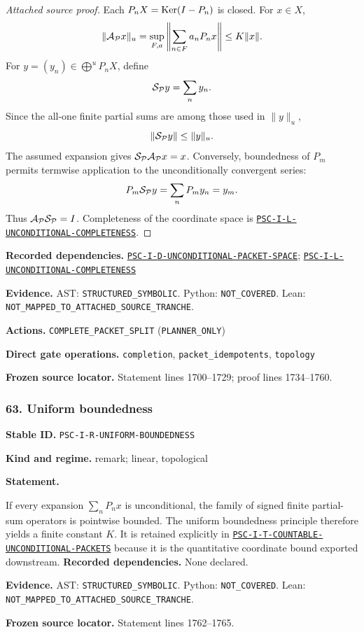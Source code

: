 \documentclass[a4paper,11pt]{article}
\newcommand{\field}[2]{\noindent\textbf{#1.} #2\par}
\begin{document}
\begin{proof}[Attached source proof]
Each $P_nX=\operatorname{Ker}(I-P_n)$ is closed.  For $x\in X$,
\[
\|\mathcal A_{\mathcal P}x\|_u
=
\sup_{F,a}
\left\|\sum_{n\in F}a_nP_nx\right\|
\leq K\|x\|.
\]
For $y=(y_n)\in\bigoplus^uP_nX$, define
\[
\mathcal S_{\mathcal P}y=\sum_ny_n.
\]
Since the all-one finite partial sums are among those used in $\|y\|_u$,
\[
\|\mathcal S_{\mathcal P}y\|
\leq\|y\|_u.
\]
The assumed expansion gives $\mathcal S_{\mathcal P}\mathcal A_{\mathcal P}x=x$.  Conversely, boundedness of $P_m$ permits termwise application to the unconditionally convergent series:
\[
P_m\mathcal S_{\mathcal P}y
=
\sum_nP_my_n
=y_m.
\]
Thus $\mathcal A_{\mathcal P}\mathcal S_{\mathcal P}=I$.  Completeness of the coordinate space is \hyperref[rec:PSC-I-L-UNCONDITIONAL-COMPLETENESS]{\nolinkurl{PSC-I-L-UNCONDITIONAL-COMPLETENESS}}.
\end{proof}
\field{Recorded dependencies}{\hyperref[rec:PSC-I-D-UNCONDITIONAL-PACKET-SPACE]{\nolinkurl{PSC-I-D-UNCONDITIONAL-PACKET-SPACE}}; \hyperref[rec:PSC-I-L-UNCONDITIONAL-COMPLETENESS]{\nolinkurl{PSC-I-L-UNCONDITIONAL-COMPLETENESS}}}
\field{Evidence}{AST: \nolinkurl{STRUCTURED_SYMBOLIC}. Python: \nolinkurl{NOT_COVERED}. Lean: \nolinkurl{NOT_MAPPED_TO_ATTACHED_SOURCE_TRANCHE}.}
\field{Actions}{\nolinkurl{COMPLETE_PACKET_SPLIT} (\nolinkurl{PLANNER_ONLY})}
\field{Direct gate operations}{\nolinkurl{completion}, \nolinkurl{packet_idempotents}, \nolinkurl{topology}}
\field{Frozen source locator}{Statement lines 1700--1729; proof lines 1734--1760.}
\subsubsection*{63. Uniform boundedness}
\label{rec:PSC-I-R-UNIFORM-BOUNDEDNESS}
\field{Stable ID}{\nolinkurl{PSC-I-R-UNIFORM-BOUNDEDNESS}}
\field{Kind and regime}{remark; linear, topological}
\textbf{Statement.}\par
If every expansion $\sum_nP_nx$ is unconditional, the family of signed finite partial-sum operators is pointwise bounded.  The uniform boundedness principle therefore yields a finite constant $K$.  It is retained explicitly in \hyperref[rec:PSC-I-T-COUNTABLE-UNCONDITIONAL-PACKETS]{\nolinkurl{PSC-I-T-COUNTABLE-UNCONDITIONAL-PACKETS}} because it is the quantitative coordinate bound exported downstream.
\field{Recorded dependencies}{None declared.}
\field{Evidence}{AST: \nolinkurl{STRUCTURED_SYMBOLIC}. Python: \nolinkurl{NOT_COVERED}. Lean: \nolinkurl{NOT_MAPPED_TO_ATTACHED_SOURCE_TRANCHE}.}
\field{Frozen source locator}{Statement lines 1762--1765.}
\end{document}
